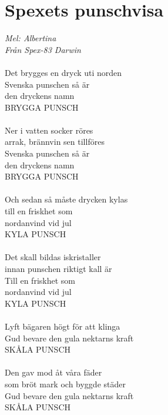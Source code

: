 \documentclass[a5paper,15pt]{article}
\begin{document}
\section{Spexets punschvisa}
\emph{Mel: Albertina\\
Från Spex-83 Darwin}\\
\\
Det brygges en dryck uti norden\\
Svenska punschen så är \\den dryckens namn\\
BRYGGA PUNSCH\\
\\
Ner i vatten socker röres\\
arrak, brännvin sen tillföres\\
Svenska punschen så är \\den dryckens namn\\
BRYGGA PUNSCH\\
\\
Och sedan så måste drycken kylas\\
till en friskhet som \\nordanvind vid jul\\
KYLA PUNSCH\\
\\
Det skall bildas iskristaller\\
innan punschen riktigt kall är\\
Till en friskhet som \\nordanvind vid jul\\
KYLA PUNSCH\\
\\
Lyft bägaren högt för att klinga\\
Gud bevare den gula nektarns kraft\\
SKÅLA PUNSCH\\
\\
Den gav mod åt våra fäder\\
som bröt mark och byggde städer\\
Gud bevare den gula nektarns kraft\\
SKÅLA PUNSCH
\\
\end{document}
